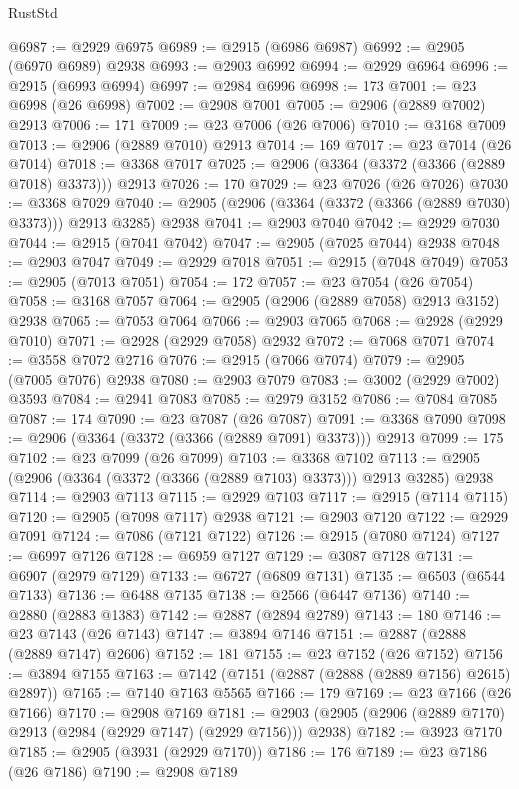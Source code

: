 \begin{lexlean}{RustStd}
\begin{coremodule}
{\begin{coremodule}
{{{{{{{{{{{{{{{{{{{{{{{{{{{{{{{{{{{{{{{{{{{{{{{{{{{{{{{{{{{{{{{{{{{{{{{{{{{{{{@6987 := @2929 @6975
@6989 := @2915 (@6986 @6987)
@6992 := @2905 (@6970 @6989) @2938
@6993 := @2903 @6992
@6994 := @2929 @6964
@6996 := @2915 (@6993 @6994)
@6997 := @2984 @6996
@6998 := 173
@7001 := @23 @6998 (@26 @6998)
@7002 := @2908 @7001
@7005 := @2906 (@2889 @7002) @2913
@7006 := 171
@7009 := @23 @7006 (@26 @7006)
@7010 := @3168 @7009
@7013 := @2906 (@2889 @7010) @2913
@7014 := 169
@7017 := @23 @7014 (@26 @7014)
@7018 := @3368 @7017
@7025 := @2906 (@3364 (@3372 (@3366 (@2889 @7018) @3373))) @2913
@7026 := 170
@7029 := @23 @7026 (@26 @7026)
@7030 := @3368 @7029
@7040 := @2905 (@2906 (@3364 (@3372 (@3366 (@2889 @7030) @3373))) @2913 @3285) @2938
@7041 := @2903 @7040
@7042 := @2929 @7030
@7044 := @2915 (@7041 @7042)
@7047 := @2905 (@7025 @7044) @2938
@7048 := @2903 @7047
@7049 := @2929 @7018
@7051 := @2915 (@7048 @7049)
@7053 := @2905 (@7013 @7051)
@7054 := 172
@7057 := @23 @7054 (@26 @7054)
@7058 := @3168 @7057
@7064 := @2905 (@2906 (@2889 @7058) @2913 @3152) @2938
@7065 := @7053 @7064
@7066 := @2903 @7065
@7068 := @2928 (@2929 @7010)
@7071 := @2928 (@2929 @7058) @2932
@7072 := @7068 @7071
@7074 := @3558 @7072 @2716
@7076 := @2915 (@7066 @7074)
@7079 := @2905 (@7005 @7076) @2938
@7080 := @2903 @7079
@7083 := @3002 (@2929 @7002) @3593
@7084 := @2941 @7083
@7085 := @2979 @3152
@7086 := @7084 @7085
@7087 := 174
@7090 := @23 @7087 (@26 @7087)
@7091 := @3368 @7090
@7098 := @2906 (@3364 (@3372 (@3366 (@2889 @7091) @3373))) @2913
@7099 := 175
@7102 := @23 @7099 (@26 @7099)
@7103 := @3368 @7102
@7113 := @2905 (@2906 (@3364 (@3372 (@3366 (@2889 @7103) @3373))) @2913 @3285) @2938
@7114 := @2903 @7113
@7115 := @2929 @7103
@7117 := @2915 (@7114 @7115)
@7120 := @2905 (@7098 @7117) @2938
@7121 := @2903 @7120
@7122 := @2929 @7091
@7124 := @7086 (@7121 @7122)
@7126 := @2915 (@7080 @7124)
@7127 := @6997 @7126
@7128 := @6959 @7127
@7129 := @3087 @7128
@7131 := @6907 (@2979 @7129)
@7133 := @6727 (@6809 @7131)
@7135 := @6503 (@6544 @7133)
@7136 := @6488 @7135
@7138 := @2566 (@6447 @7136)
@7140 := @2880 (@2883 @1383)
@7142 := @2887 (@2894 @2789)
@7143 := 180
@7146 := @23 @7143 (@26 @7143)
@7147 := @3894 @7146
@7151 := @2887 (@2888 (@2889 @7147) @2606)
@7152 := 181
@7155 := @23 @7152 (@26 @7152)
@7156 := @3894 @7155
@7163 := @7142 (@7151 (@2887 (@2888 (@2889 @7156) @2615) @2897))
@7165 := @7140 @7163 @5565
@7166 := 179
@7169 := @23 @7166 (@26 @7166)
@7170 := @2908 @7169
@7181 := @2903 (@2905 (@2906 (@2889 @7170) @2913 (@2984 (@2929 @7147) (@2929 @7156))) @2938)
@7182 := @3923 @7170
@7185 := @2905 (@3931 (@2929 @7170))
@7186 := 176
@7189 := @23 @7186 (@26 @7186)
@7190 := @2908 @7189
}}}}}}}}}}}}}}}}}}}}}}}}}}}}}}}}}}}}}}}}}}}}}}}}}}}}}}}}}}}}}}}}}}}}}}}}}}}}}}
\end{coremodule}}
\end{coremodule}
\end{lexlean}
